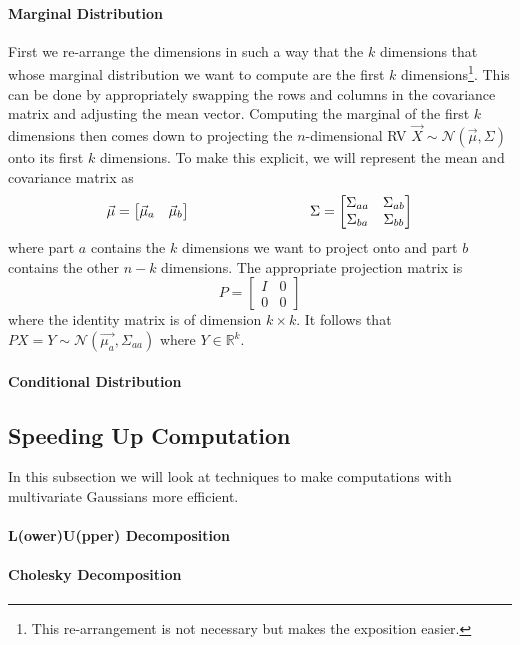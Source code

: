 \documentclass[a4paper,11pt,leqno]{report}\usepackage[]{graphicx}\usepackage[]{color}
\newcommand{\N}[2]{\mathcal{N}\left( #1, #2 \right)}
\begin{document}
\paragraph{Marginal Distribution} First we re-arrange the dimensions in such a way that the $ k $ dimensions that whose marginal distribution we want to compute
are the first $ k $ dimensions\footnote{This re-arrangement is not necessary but makes the exposition easier.}. This can be done by appropriately swapping the rows and 
columns in the covariance matrix and adjusting the mean vector. Computing the marginal of the first $ k $ dimensions then comes down to projecting the 
$ n $-dimensional RV $ \vec{X} \sim \N{\vec{\mu}}{\Sigma} $ onto its first $ k $ dimensions. To make this explicit, we will represent the mean and covariance matrix
as
\begin{equation}
\vec{\mu} = \begin{bmatrix}
\vec{\mu}_{a} & \vec{\mu}_{b}
\end{bmatrix} \hskip 3cm
\Sigma = \begin{bmatrix}
\Sigma_{aa} & \Sigma_{ab} \\
\Sigma_{ba} & \Sigma_{bb}
\end{bmatrix}
\end{equation}
where part $ a $ contains the $ k $ dimensions we want to project onto and part $ b $ contains the other $ n-k $ dimensions. The appropriate projection matrix
is
\begin{equation}
P = \begin{bmatrix}
I & 0 \\
0 & 0
\end{bmatrix}
\end{equation}
where the identity matrix is of dimension $ k \times k $. It follows that $ PX = Y \sim \N{\vec{\mu_{a}}}{\Sigma_{aa}} $ where $ Y \in \mathbb{R}^{k} $.

\paragraph{Conditional Distribution}

\subsection{Speeding Up Computation}

In this subsection we will look at techniques to make computations with multivariate Gaussians more efficient.

\paragraph{L(ower)U(pper) Decomposition}


\paragraph{Cholesky Decomposition}
\end{document}
